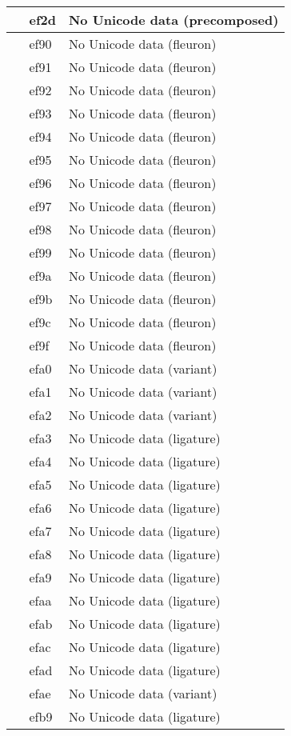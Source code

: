 \documentclass[12pt,letterpaper,openany]{book}
\begin{document}
\begin{center}
\begin{supertabular}{|m{0.25in}|m{0.5in}|m{4in}|}
 & ef2d & No Unicode data (precomposed)\\\hline
 & ef90 & No Unicode data (fleuron)\\\hline
 & ef91 & No Unicode data (fleuron)\\\hline
 & ef92 & No Unicode data (fleuron)\\\hline
 & ef93 & No Unicode data (fleuron)\\\hline
 & ef94 & No Unicode data (fleuron)\\\hline
 & ef95 & No Unicode data (fleuron)\\\hline
 & ef96 & No Unicode data (fleuron)\\\hline
 & ef97 & No Unicode data (fleuron)\\\hline
 & ef98 & No Unicode data (fleuron)\\\hline
 & ef99 & No Unicode data (fleuron)\\\hline
 & ef9a & No Unicode data (fleuron)\\\hline
 & ef9b & No Unicode data (fleuron)\\\hline
 & ef9c & No Unicode data (fleuron)\\\hline
 & ef9f & No Unicode data (fleuron)\\\hline
 & efa0 & No Unicode data (variant)\\\hline
 & efa1 & No Unicode data (variant)\\\hline
 & efa2 & No Unicode data (variant)\\\hline
 & efa3 & No Unicode data (ligature)\\\hline
 & efa4 & No Unicode data (ligature)\\\hline
 & efa5 & No Unicode data (ligature)\\\hline
 & efa6 & No Unicode data (ligature)\\\hline
 & efa7 & No Unicode data (ligature)\\\hline
 & efa8 & No Unicode data (ligature)\\\hline
 & efa9 & No Unicode data (ligature)\\\hline
 & efaa & No Unicode data (ligature)\\\hline
 & efab & No Unicode data (ligature)\\\hline
 & efac & No Unicode data (ligature)\\\hline
 & efad & No Unicode data (ligature)\\\hline
 & efae & No Unicode data (variant)\\\hline
 & efb9 & No Unicode data (ligature)\\\hline

\end{supertabular}
\end{center}
\end{document}
